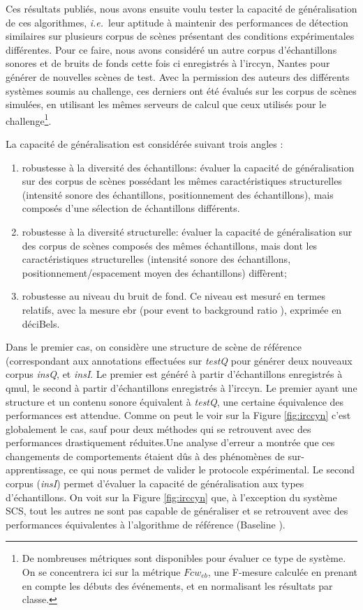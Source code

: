   Ces résultats publiés\cite{stowellhal-01253912}, nous avons ensuite voulu tester la capacité de généralisation de ces algorithmes, \textit{i.e.}~leur aptitude à maintenir des performances de détection similaires sur plusieurs corpus de scènes présentant des conditions expérimentales différentes. Pour ce faire, nous avons considéré un autre corpus d'échantillons sonores et de bruits de fonds  cette fois ci enregistrés à l'irccyn, Nantes pour générer de nouvelles scènes de test. Avec la permission des auteurs des différents systèmes soumis au challenge, ces derniers ont été évalués sur les corpus de scènes simulées, en utilisant les mêmes serveurs de calcul que ceux utilisés pour le challenge\footnote{De nombreuses métriques sont disponibles pour évaluer ce type de système. On se concentrera ici sur la métrique $Fcw_{eb}$, une F-mesure calculée en prenant en compte les débuts des événements, et en normalisant les résultats par classe.}.

  La capacité de généralisation est considérée suivant trois angles :
  \begin{enumerate}
    \item robustesse à la diversité des échantillons: évaluer la capacité de généralisation sur des corpus de scènes possédant les mêmes caractéristiques structurelles (intensité sonore des échantillons, positionnement des échantillons), mais composés d'une sélection de échantillons différents.
    \item robustesse à la diversité structurelle: évaluer la capacité de généralisation sur des corpus de scènes composés des mêmes échantillons, mais dont les caractéristiques structurelles (intensité sonore des échantillons, positionnement/espacement moyen des échantillons) diffèrent;
    \item robustesse au niveau du bruit de fond. Ce niveau est mesuré en termes relatifs, avec la mesure ebr (pour \og event to background ratio \fg), exprimée en déciBels.
  \end{enumerate}

  Dans le premier cas, on considère une structure de scène de référence (correspondant aux annotations effectuées sur \emph{testQ} pour générer deux nouveaux corpus \emph{insQ}, et \emph{insI}. Le premier est généré à partir d'échantillons enregistrés à qmul, le second à partir d'échantillons enregistrés à l'irccyn. Le premier ayant une structure et un contenu sonore équivalent à \emph{testQ}, une certaine équivalence des performances est attendue. Comme on peut le voir sur la Figure \ref{fig:irccyn} c'est globalement le cas, sauf pour deux méthodes qui se retrouvent avec des performances drastiquement réduites.Une analyse d'erreur a montrée que ces changements de comportements étaient dûs à des phénomènes de sur-apprentissage, ce qui nous permet de valider le protocole expérimental. Le second corpus (\emph{insI}) permet d'évaluer la capacité de généralisation aux types d'échantillons. On voit sur la Figure \ref{fig:irccyn} que, à l'exception du système SCS, tout les autres ne sont pas capable de généraliser et se retrouvent avec des performances équivalentes à l'algorithme de référence (\og Baseline \fg).

